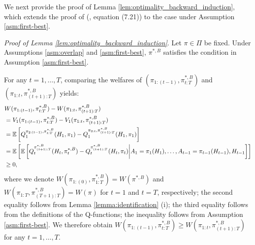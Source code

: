 \medskip

We next provide the proof of Lemma \ref{lem:optimality_backward_induction}, which extends the proof of \citeauthor{Tsiatis_et_al_2019} (\citeyear{Tsiatis_et_al_2019}, equation (7.21)) to the case under Assumption \ref{asm:first-best}.

\bigskip
\noindent
\textit{Proof of Lemma \ref{lem:optimality_backward_induction}}.
Let $\pi \in \Pi$ be fixed. Under Assumptions \ref{asm:overlap} and \ref{asm:first-best}, $\pi^{\ast,B}$ satisfies the condition in Assumption \ref{asm:first-best}.

For any $t=1,\ldots,T$,  comparing the welfares of $(\pi_{1:(t-1)},\pi_{t:T}^{\ast,B})$ and $(\pi_{1:t},\pi_{(t+1):T}^{\ast,B})$ yields:
\begin{align*}
    &W(\pi_{1:(t-1)},\pi_{t:T}^{\ast,B}) - W(\pi_{1:t},\pi_{(t+1):T}^{\ast,B}) \\
    &= V_{1}(\pi_{1:(t-1)},\pi_{t:T}^{\ast,B}) - V_{1}(\pi_{1:t},\pi_{(t+1):T}^{\ast,B}) \\
    &= \mathbb{E}\left[Q_{1}^{\pi_{2:(t-1)},\pi_{t:T}^{\ast,B}}(H_{1},\pi_{1}) - Q_{1}^{\pi_{2:t},\pi_{(t+1):T}^{\ast,B}}(H_{1},\pi_{1})\right] \\
    &=\mathbb{E}\left[\mathbb{E}\left[Q_{t}^{\pi_{(t+1):T}^{\ast,B}}(H_{t},\pi_{t}^{\ast,B}) - Q_{t}^{\pi_{(t+1):T}^{\ast,B}}(H_{t},\pi_{t})\middle| A_{1}=\pi_{1}(H_1),\ldots, A_{t-1}=\pi_{t-1}(H_{t-1}), H_{t-1} \right] \right] \\
    &\geq 0,
\end{align*}
where we denote $W(\pi_{1:(0)},\pi_{1:T}^{\ast,B})=W(\pi^{\ast,B})$ and $W(\pi_{1:T},\pi_{(T+1):T}^{\ast,B})=W(\pi)$ for $t=1$ and $t=T$, respectively; the second equality follows from Lemma \ref{lemma:identification} (i); the third equality follows from the definitions of the Q-functions; the inequality follows from Assumption \ref{asm:first-best}.   We therefore obtain $W(\pi_{1:(t-1)},\pi_{t:T}^{\ast,B}) \geq W(\pi_{1:t},\pi_{(t+1):T}^{\ast,B})$ for any $t=1,\ldots,T$.

